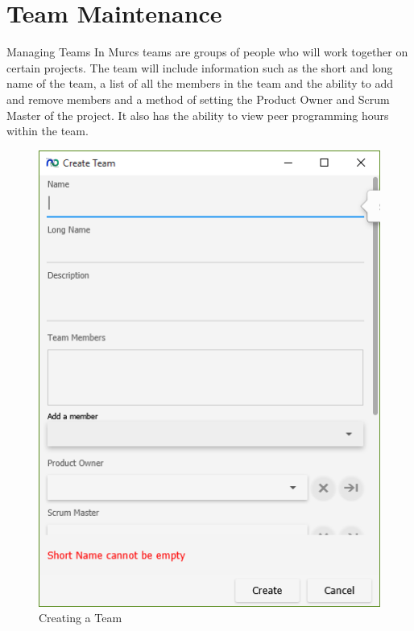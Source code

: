 \section{Team Maintenance}

Managing Teams
\newline\newline
In Murcs teams are groups of people who will work together on certain projects. The team will include information such as the short and long name of the team, a list of all the members in the team and the ability to add and remove members and a method of setting the Product Owner and Scrum Master of the project. It also has the ability to view peer programming hours within the team.
\newline

\begin{figure}[H]
	\centering
	\includegraphics[width=\textwidth]{images/screenshots/teams1.PNG}
	\caption{Creating a Team}
	\label{fig:new_project}
\end{figure}

